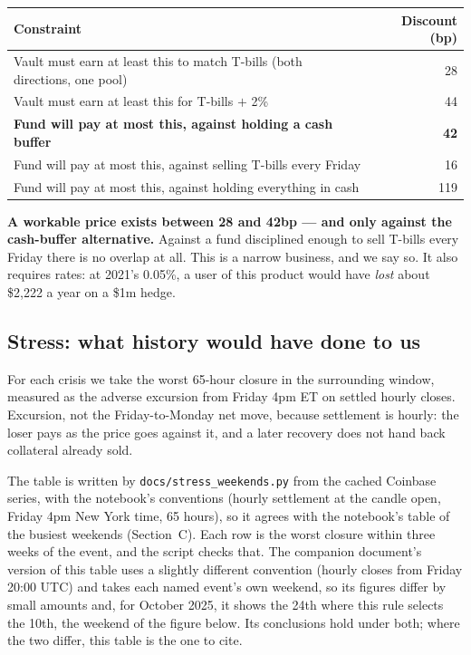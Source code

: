 \documentclass[11pt,a4paper]{article}
\newcommand{\cbox}[1]{%
  \begin{center}\colorbox{panel}{\parbox{0.95\textwidth}{\vspace{3pt}#1\vspace{3pt}}}\end{center}}
\begin{document}
\begin{center}
\small
\begin{tabular}{@{}p{10.0cm}r@{}}
\toprule
\textbf{Constraint} & \textbf{Discount (bp)} \\
\midrule
Vault must earn at least this to match T-bills (both directions, one pool) & 28 \\
Vault must earn at least this for T-bills $+$ 2\% & 44 \\
\textbf{Fund will pay at most this, against holding a cash buffer} & \textbf{42} \\
Fund will pay at most this, against selling T-bills every Friday & 16 \\
Fund will pay at most this, against holding everything in cash & 119 \\
\bottomrule
\end{tabular}
\end{center}

\cbox{\textbf{A workable price exists between 28 and 42bp — and only against the cash-buffer
alternative.} Against a fund disciplined enough to sell T-bills every Friday there is no overlap at
all. This is a narrow business, and we say so. It also requires rates: at 2021's 0.05\%, a user of
this product would have \emph{lost} about \$2,222 a year on a \$1m hedge.}

\subsection{Stress: what history would have done to us}\label{sec:regimes}

For each crisis we take the worst 65-hour closure in the surrounding window, measured as the adverse
excursion from Friday 4pm ET on settled hourly closes. Excursion, not the Friday-to-Monday net move,
because settlement is hourly: the loser pays as the price goes against it, and a later recovery does
not hand back collateral already sold.

The table is written by \texttt{docs/stress\_weekends.py} from the cached Coinbase series, with the
notebook's conventions (hourly settlement at the candle open, Friday 4pm New York time, 65 hours), so
it agrees with the notebook's table of the busiest weekends (Section~C). Each row is the worst
closure within three weeks of the event, and the script checks that. The companion document's
version of this table uses a slightly different convention (hourly closes from Friday 20:00 UTC) and
takes each named event's own weekend, so its figures differ by small amounts and, for October 2025,
it shows the 24th where this rule selects the 10th, the weekend of the figure below. Its conclusions
hold under both; where the two differ, this table is the one to cite.
\end{document}
